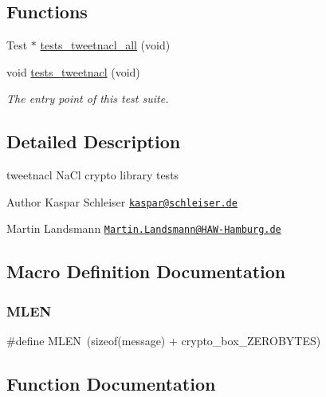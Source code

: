 \subsection*{Functions}
\begin{DoxyCompactItemize}
\item 
Test $\ast$ \hyperlink{tests-tweetnacl_8c_a8edb7617bfd6d191935978409d6c766c}{tests\+\_\+tweetnacl\+\_\+all} (void)
\item 
void \hyperlink{group__unittests_gaa48af13c9647d85886796d6c526776a1}{tests\+\_\+tweetnacl} (void)
\begin{DoxyCompactList}\small\item\em The entry point of this test suite. \end{DoxyCompactList}\end{DoxyCompactItemize}


\subsection{Detailed Description}
tweetnacl Na\+Cl crypto library tests 

\begin{DoxyAuthor}{Author}
Kaspar Schleiser \href{mailto:kaspar@schleiser.de}{\tt kaspar@schleiser.\+de} 

Martin Landsmann \href{mailto:Martin.Landsmann@HAW-Hamburg.de}{\tt Martin.\+Landsmann@\+H\+A\+W-\/\+Hamburg.\+de} 
\end{DoxyAuthor}


\subsection{Macro Definition Documentation}
\mbox{\label{tests-tweetnacl_8c_ac3eedd936f5521b2f59607a6a21e6064}} 
\subsubsection{\texorpdfstring{M\+L\+EN}{MLEN}}
{\footnotesize\ttfamily \#define M\+L\+EN~(sizeof(message) + crypto\+\_\+box\+\_\+\+Z\+E\+R\+O\+B\+Y\+T\+ES)}



\subsection{Function Documentation}
\mbox{\label{tests-tweetnacl_8c_a8edb7617bfd6d191935978409d6c766c}} 
